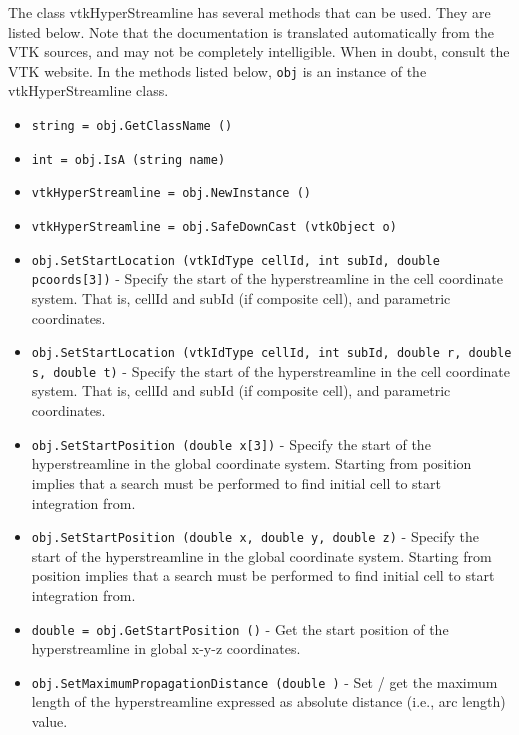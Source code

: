 The class vtkHyperStreamline has several methods that can be used.
  They are listed below.
Note that the documentation is translated automatically from the VTK sources,
and may not be completely intelligible.  When in doubt, consult the VTK website.
In the methods listed below, \verb|obj| is an instance of the vtkHyperStreamline class.
\begin{itemize}
\item  \verb|string = obj.GetClassName ()|

\item  \verb|int = obj.IsA (string name)|

\item  \verb|vtkHyperStreamline = obj.NewInstance ()|

\item  \verb|vtkHyperStreamline = obj.SafeDownCast (vtkObject o)|

\item  \verb|obj.SetStartLocation (vtkIdType cellId, int subId, double pcoords[3])| -  Specify the start of the hyperstreamline in the cell coordinate system. 
 That is, cellId and subId (if composite cell), and parametric coordinates.

\item  \verb|obj.SetStartLocation (vtkIdType cellId, int subId, double r, double s, double t)| -  Specify the start of the hyperstreamline in the cell coordinate system. 
 That is, cellId and subId (if composite cell), and parametric coordinates.

\item  \verb|obj.SetStartPosition (double x[3])| -  Specify the start of the hyperstreamline in the global coordinate system. 
 Starting from position implies that a search must be performed to find 
 initial cell to start integration from.

\item  \verb|obj.SetStartPosition (double x, double y, double z)| -  Specify the start of the hyperstreamline in the global coordinate system. 
 Starting from position implies that a search must be performed to find 
 initial cell to start integration from.

\item  \verb|double = obj.GetStartPosition ()| -  Get the start position of the hyperstreamline in global x-y-z coordinates.

\item  \verb|obj.SetMaximumPropagationDistance (double )| -  Set / get the maximum length of the hyperstreamline expressed as absolute
 distance (i.e., arc length) value.


\end{itemize}

